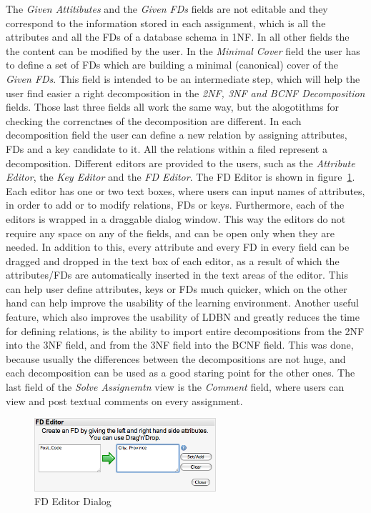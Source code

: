 The \textit{Given Attitibutes} and the \textit{Given FDs} fields are not editable
and they correspond	to the information stored in each assignment, which is all the 
attributes and all the FDs of a database schema in 1NF. In all other fields 
the the content can be modified by the user.
In the \textit{Minimal Cover} field the user has to define a set of FDs
which are building a minimal (canonical) cover of the \textit{Given FDs}. 
This field is intended to be an intermediate step, which will help the user find easier a right decomposition
in the \textit{2NF, 3NF and BCNF Decomposition} fields. Those last three fields all
work the same way, but the alogotithms for checking the correnctnes of the 
decomposition are different.  
In each decomposition field the user can define a new
relation by assigning attributes, FDs and a key candidate to it. All the relations
within a filed represent a decomposition. Different editors are provided to the users,
such as
the \textit{Attribute Editor}, the \textit{Key Editor} and the \textit{FD Editor}.
The FD Editor is shown in figure~\ref{fig:fdedit}. Each editor has one or two
text boxes, where users can input names of attributes, in order to 
add or to modify relations, FDs or keys. Furthermore,
each of the editors is wrapped in a draggable dialog window. 
This way the editors do not require any space on any of the fields, 
and can be open only when they are needed.
In addition to this, every attribute and every FD in every field can be dragged and
dropped in the text box of each editor, as a result of which the attributes/FDs
are automatically inserted in the text areas of the editor.
This can help user define attributes, keys or
FDs much quicker, which on the other hand can help improve the usability of 
the learning environment. 
Another useful feature, which also improves the usability of LDBN and greatly reduces
the time for defining relations, 
is the ability to 
import entire decompositions from the 2NF into the 3NF field, and from the 
3NF field into the BCNF field. This was done, because usually 
the differences between the decompositions are not huge, and each decomposition
can be used as a good staring point for the other ones.	
The last field of the \textit{Solve Assignemtn} view is the \textit{Comment} field, 
where users can view and post textual comments on every assignment.
\newline

\begin{figure}[h]
	\begin{center}
		\includegraphics[width=0.6\textwidth]{./img/screen04.png}
		\caption{FD Editor Dialog}
		\label{fig:fdedit}
	\end{center}
\end{figure}

